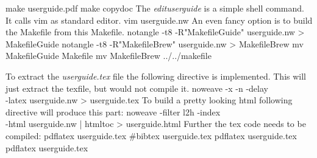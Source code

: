 \documentclass{llncs}%
\begin{document}
        make userguide.pdf
        make copydoc
\nwendcode{}\nwdocspar
The {\em edituserguide} is a simple shell command. It calls vim as standard editor.
\nwenddocs{}\endmoddef\nwstartdeflinemarkup{}\nwenddeflinemarkup
        vim userguide.nw
\nwendcode{}\nwdocspar
An even fancy option is to build the Makefile from this Makefile.
\nwenddocs{}\endmoddef\nwstartdeflinemarkup{}\nwenddeflinemarkup
        notangle -t8 -R"MakefileGuide" userguide.nw > MakefileGuide
        notangle -t8 -R"MakefileBrew" userguide.nw > MakefileBrew
        mv MakefileGuide Makefile
        mv MakefileBrew ../../makefile
\nwendcode{}\nwdocspar

To extract the {\em userguide.tex} file the following directive is implemented. This will just extract the texfile, but would not compile it.
\nwenddocs{}\endmoddef\nwstartdeflinemarkup{}\nwenddeflinemarkup
        noweave -x -n -delay \\
        -latex userguide.nw > userguide.tex 
\nwendcode{}\nwdocspar
To build a pretty looking html following directive will produce this part:
\nwenddocs{}\endmoddef\nwstartdeflinemarkup{}\nwenddeflinemarkup
        noweave -filter l2h -index \\
        -html userguide.nw | htmltoc > userguide.html
\nwendcode{}\nwdocspar
Further the tex code needs to be compiled:
\nwenddocs{}\endmoddef\nwstartdeflinemarkup{}\nwenddeflinemarkup
        pdflatex userguide.tex
        #bibtex userguide.tex
        pdflatex userguide.tex
        pdflatex userguide.tex
\nwendcode{}\nwdocspar
\end{document}
